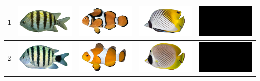 \begin{longtable}{|c|c|c|c|c|}
    1 & \includegraphics[width=3cm]{gambar/abudefduf/A1} & \includegraphics[width=3cm]{gambar/amphiprion/A1} & \includegraphics[width=3cm]{gambar/chaetodon/C1} & \includegraphics[width=3cm]{gambar/negative_examples/N1} \\
    \hline
    2 & \includegraphics[width=3cm]{gambar/abudefduf/A2} & \includegraphics[width=3cm]{gambar/amphiprion/A2} & \includegraphics[width=3cm]{gambar/chaetodon/C2} & \includegraphics[width=3cm]{gambar/negative_examples/N2} \\
    \hline

\end{longtable}
